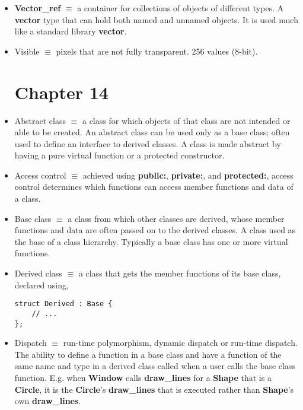 \documentclass[12pt]{article}
\begin{document}
\begin{itemize}
\item \textbf{Vector\_ref} $\equiv$ a container for collections of objects of different types. A \textbf{vector} type that can hold both named and unnamed objects. It is used much like a standard library \textbf{vector}.

\item Visible $\equiv$ pixels that are not fully transparent. 256 values (8-bit).

\section*{Chapter 14}

\item Abstract class $\equiv$ a class for which objects of that class are not intended or able to be created. An abstract class can be used only as a base class; often used to define an interface to derived classes. A class is made abstract by having a pure virtual function or a protected constructor.

\item Access control $\equiv$ achieved using \textbf{public:}, \textbf{private:}, and \textbf{protected:}, access control determines which functions can access member functions and data of a class.

\item Base class $\equiv$ a class from which other classes are derived, whose member functions and data are often passed on to the derived classes. A class used as the base of a class hierarchy. Typically a base class has one or more virtual functions.

\item Derived class $\equiv$ a class that gets the member functions of its base class, declared using,

\begin{lstlisting}
struct Derived : Base {
	// ...
};
\end{lstlisting}

\item Dispatch $\equiv$ run-time polymorphism, dynamic dispatch or run-time dispatch. The ability to define a function in a base class and have a function of the same name and type in a derived class called when a user calls the base class function. E.g. when \textbf{Window} calls \textbf{draw\_lines} for a \textbf{Shape} that is a \textbf{Circle}, it is the \textbf{Circle}'s \textbf{draw\_lines} that is executed rather than \textbf{Shape}'s own \textbf{draw\_lines}.


\end{itemize}
\end{document}
